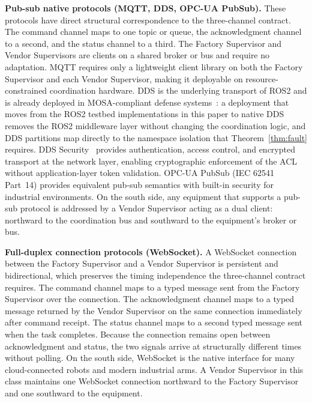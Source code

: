 \documentclass[a4paper,fleqn]{cas-dc}
\begin{document}
\textbf{Pub-sub native protocols (MQTT, DDS, OPC-UA PubSub).} These protocols have direct structural correspondence to the three-channel contract. The command channel maps to one topic or queue, the acknowledgment channel to a second, and the status channel to a third. The Factory Supervisor and Vendor Supervisors are clients on a shared broker or bus and require no adaptation. MQTT requires only a lightweight client library on both the Factory Supervisor and each Vendor Supervisor, making it deployable on resource-constrained coordination hardware. DDS is the underlying transport of ROS2 and is already deployed in MOSA-compliant defense systems~\cite{omg2018dds}: a deployment that moves from the ROS2 testbed implementations in this paper to native DDS removes the ROS2 middleware layer without changing the coordination logic, and DDS partitions map directly to the namespace isolation that Theorem~\ref{thm:fault} requires. DDS Security~\cite{omg2018dds} provides authentication, access control, and encrypted transport at the network layer, enabling cryptographic enforcement of the ACL without application-layer token validation. OPC-UA PubSub (IEC 62541 Part~14) provides equivalent pub-sub semantics with built-in security for industrial environments. On the south side, any equipment that supports a pub-sub protocol is addressed by a Vendor Supervisor acting as a dual client: northward to the coordination bus and southward to the equipment's broker or bus.

\textbf{Full-duplex connection protocols (WebSocket).} A WebSocket connection between the Factory Supervisor and a Vendor Supervisor is persistent and bidirectional, which preserves the timing independence the three-channel contract requires. The command channel maps to a typed message sent from the Factory Supervisor over the connection. The acknowledgment channel maps to a typed message returned by the Vendor Supervisor on the same connection immediately after command receipt. The status channel maps to a second typed message sent when the task completes. Because the connection remains open between acknowledgment and status, the two signals arrive at structurally different times without polling. On the south side, WebSocket is the native interface for many cloud-connected robots and modern industrial arms. A Vendor Supervisor in this class maintains one WebSocket connection northward to the Factory Supervisor and one southward to the equipment.
\end{document}
